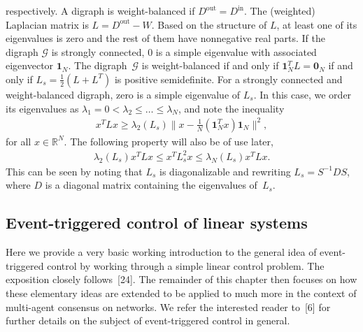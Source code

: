 \documentclass[]{book}
\newcommand{\real}{{\mathbb{R}}}
\newcommand{\GG}{{\mathcal{G}}}
\newcommand{\Dout}{D^{\operatorname{out}}}
\newcommand{\Din}{D^{\operatorname{in}}}
\newcommand{\ones}[1]{\mathbf{1}_{#1}}
\newcommand{\zeros}[1]{\mathbf{0}_{#1}}
\newcommand{\Sym}[1]{{#1}_{s}}
\newcommand{\commgraph}{\GG_\text{comm}}
\renewcommand{\commgraph}{\GG}
\begin{document}
respectively. A digraph is weight-balanced if $\Dout = \Din$.  The
(weighted) Laplacian matrix is $L = \Dout - W$. Based on the structure
of $L$, at least one of its eigenvalues is zero and the rest of them
have nonnegative real parts.  If the digraph $\commgraph$ is strongly
connected, $0$ is a simple eigenvalue with associated eigenvector
$\ones{N}$.  The digraph~$\commgraph$ is weight-balanced if and only
if $\ones{N}^T L = \zeros{N}$ if and only if $ \Sym{L}=\frac{1}{2}(L +
L^T)$ is positive semidefinite.  For a strongly connected and
weight-balanced digraph, zero is a simple eigenvalue of $\Sym{L} $.
In this case, we order its eigenvalues as $\lambda_1 = 0<\lambda_2\leq
\dots \leq \lambda_N$, and note the inequality
\begin{align}\label{eq:LapBound}
  x^T L x \ge \lambda_2(\Sym{L}) \| x -\frac{1}{N} (\ones{N}^T x)
  \ones{N} \|^2 ,
\end{align}
for all $x \in \real^N$.  The following property will also be of use
later,
\begin{align}\label{eq:lap2-bound}
  \lambda_2(\Sym{L}) x^T L x \leq x^T \Sym{L}^2 x \leq
  \lambda_N(\Sym{L}) x^T L x .
\end{align}
This can be seen by noting that $\Sym{L}$ is diagonalizable and
rewriting $\Sym{L} = S^{-1} D S$, where $D$ is a diagonal matrix
containing the eigenvalues of~$\Sym{L}$.

%

\subsection{Event-triggered control of linear systems}\label{se:event}

Here we provide a very basic working introduction to the general idea of event-triggered control
by working through a simple linear control problem. The exposition closely
follows~[24]. The remainder of this chapter then focuses
on how these elementary ideas are extended to be applied to much more in the context of multi-agent
consensus on networks. We refer the interested reader to~[6] for further details on the subject of event-triggered control in general.
\end{document}
